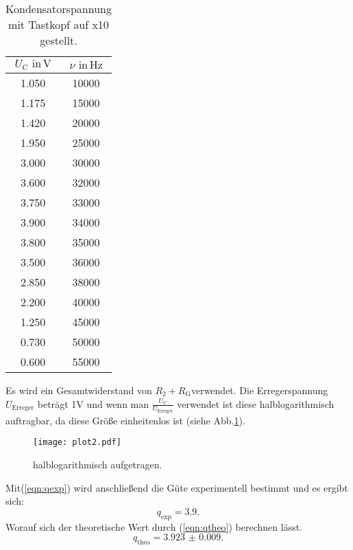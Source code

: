 \begin{table}[h]
  \centering
  \label{tab:Uc}
  \begin{tabular}{ c c }
    \toprule
    {$U_{\text{C}} \,\, \text{in} \,\si{\volt}$}
   &{$\nu \,\, \text{in} \,\si{\hertz}$} \\

    \midrule
    1.050  & 10000 \\
    1.175  & 15000 \\
    1.420  & 20000 \\
    1.950  & 25000 \\
    3.000  & 30000 \\
    3.600  & 32000 \\
    3.750  & 33000 \\
    3.900  & 34000 \\
    3.800  & 35000 \\
    3.500  & 36000 \\
    2.850  & 38000 \\
    2.200  & 40000 \\
    1.250  & 45000 \\
    0.730  & 50000 \\
    0.600  & 55000 \\

    \bottomrule
  \end{tabular}
  \caption{Kondensatorspannung mit Tastkopf auf x10 gestellt.}
\end{table}

Es wird ein Gesamtwiderstand von $R_\text{2} + R_\text{G} $verwendet.
Die Erregerspannung $U_{\text{Erreger}}$ beträgt 1V und wenn man $\frac{U_{C}}{U_{\text{Erreger}}}$
verwendet ist diese halblogarithmisch auftragbar, da diese Größe einheitenlos ist (siehe Abb.\ref{fig:plot2}).

\begin{figure}
  \centering
  \texttt{[image: plot2.pdf]}
  \caption{halblogarithmisch aufgetragen.}
  \label{fig:plot2}
\end{figure}

Mit(\ref{eqn:qexp}) wird anschließend die Güte experimentell bestimmt und es ergibt sich:
\begin{equation*}
  q_{\text{exp}} = 3.9.
\end{equation*}
Worauf sich der theoretische Wert durch (\ref{eqn:qtheo}) berechnen lässt.
\begin{equation*}
  q_{\text{theo}} = \num{3.923(9)}.
\end{equation*}

